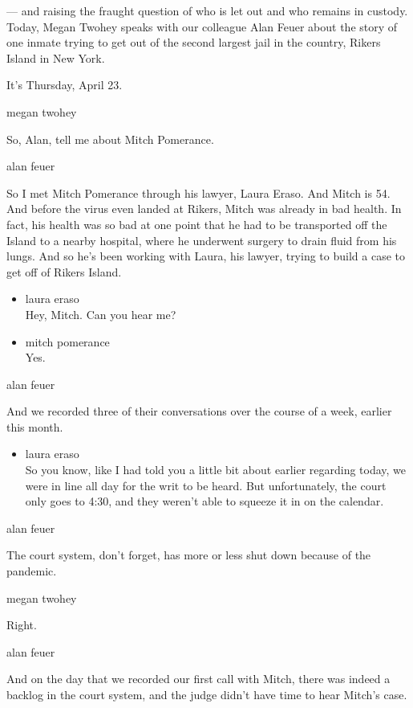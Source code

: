 --- and raising the fraught question of who is let out and who remains
in custody. Today, Megan Twohey speaks with our colleague Alan Feuer
about the story of one inmate trying to get out of the second largest
jail in the country, Rikers Island in New York.

It's Thursday, April 23.

megan twohey

So, Alan, tell me about Mitch Pomerance.

alan feuer

So I met Mitch Pomerance through his lawyer, Laura Eraso. And Mitch is
54. And before the virus even landed at Rikers, Mitch was already in bad
health. In fact, his health was so bad at one point that he had to be
transported off the Island to a nearby hospital, where he underwent
surgery to drain fluid from his lungs. And so he's been working with
Laura, his lawyer, trying to build a case to get off of Rikers Island.

\begin{itemize}
\item
  laura eraso\\
  Hey, Mitch. Can you hear me?
\item
  mitch pomerance\\
  Yes.
\end{itemize}

alan feuer

And we recorded three of their conversations over the course of a week,
earlier this month.

\begin{itemize}
\tightlist
\item
  laura eraso\\
  So you know, like I had told you a little bit about earlier regarding
  today, we were in line all day for the writ to be heard. But
  unfortunately, the court only goes to 4:30, and they weren't able to
  squeeze it in on the calendar.
\end{itemize}

alan feuer

The court system, don't forget, has more or less shut down because of
the pandemic.

megan twohey

Right.

alan feuer

And on the day that we recorded our first call with Mitch, there was
indeed a backlog in the court system, and the judge didn't have time to
hear Mitch's case.

